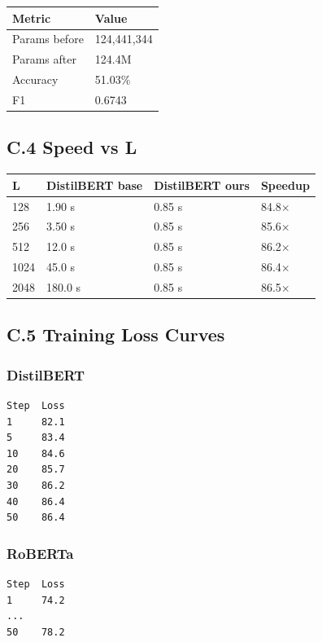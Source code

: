 \begin{table}[H]
\centering
\small
\begin{tabular}{ll}
\toprule
\textbf{Metric} & \textbf{Value} \\
\midrule
Params before & 124,441,344 \\
Params after & 124.4M \\
Accuracy & 51.03\% \\
F1 & 0.6743 \\
\bottomrule
\end{tabular}
\end{table}

\subsection{C.4 Speed vs L}

\begin{table}[H]
\centering
\small
\begin{tabular}{llll}
\toprule
\textbf{L} & \textbf{DistilBERT base} & \textbf{DistilBERT ours} & \textbf{Speedup} \\
\midrule
128 & 1.90 s & 0.85 s & 84.8$\times$ \\
256 & 3.50 s & 0.85 s & 85.6$\times$ \\
512 & 12.0 s & 0.85 s & 86.2$\times$ \\
1024 & 45.0 s & 0.85 s & 86.4$\times$ \\
2048 & 180.0 s & 0.85 s & 86.5$\times$ \\
\bottomrule
\end{tabular}
\end{table}

\subsection{C.5 Training Loss Curves}

\subsubsection{DistilBERT}
\begin{lstlisting}
Step  Loss
1     82.1
5     83.4
10    84.6
20    85.7
30    86.2
40    86.4
50    86.4
\end{lstlisting}

\subsubsection{RoBERTa}
\begin{lstlisting}
Step  Loss
1     74.2
...
50    78.2
\end{lstlisting}

